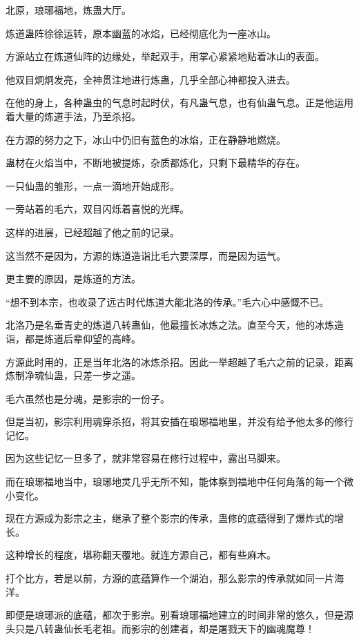 
\begin{this_body}

北原，琅琊福地，炼蛊大厅。

炼道蛊阵徐徐运转，原本幽蓝的冰焰，已经彻底化为一座冰山。

方源站立在炼道仙阵的边缘处，举起双手，用掌心紧紧地贴着冰山的表面。

他双目炯炯发亮，全神贯注地进行炼蛊，几乎全部心神都投入进去。

在他的身上，各种蛊虫的气息时起时伏，有凡蛊气息，也有仙蛊气息。正是他运用着大量的炼道手法，乃至杀招。

在方源的努力之下，冰山中仍旧有蓝色的冰焰，正在静静地燃烧。

蛊材在火焰当中，不断地被提炼，杂质都炼化，只剩下最精华的存在。

一只仙蛊的雏形，一点一滴地开始成形。

一旁站着的毛六，双目闪烁着喜悦的光辉。

这样的进展，已经超越了他之前的记录。

这当然不是因为，方源的炼道造诣比毛六要深厚，而是因为运气。

更主要的原因，是炼道的方法。

“想不到本宗，也收录了远古时代炼道大能北洛的传承。”毛六心中感慨不已。

北洛乃是名垂青史的炼道八转蛊仙，他最擅长冰炼之法。直至今天，他的冰炼造诣，都是炼道后辈仰望的高峰。

方源此时用的，正是当年北洛的冰炼杀招。因此一举超越了毛六之前的记录，距离炼制净魂仙蛊，只差一步之遥。

毛六虽然也是分魂，是影宗的一份子。

但是当初，影宗利用魂穿杀招，将其安插在琅琊福地里，并没有给予他太多的修行记忆。

因为这些记忆一旦多了，就非常容易在修行过程中，露出马脚来。

而在琅琊福地当中，琅琊地灵几乎无所不知，能体察到福地中任何角落的每一个微小变化。

现在方源成为影宗之主，继承了整个影宗的传承，蛊修的底蕴得到了爆炸式的增长。

这种增长的程度，堪称翻天覆地。就连方源自己，都有些麻木。

打个比方，若是以前，方源的底蕴算作一个湖泊，那么影宗的传承就如同一片海洋。

即便是琅琊派的底蕴，都次于影宗。别看琅琊福地建立的时间非常的悠久，但是源头只是八转蛊仙长毛老祖。而影宗的创建者，却是屠戮天下的幽魂魔尊！


\end{this_body}
